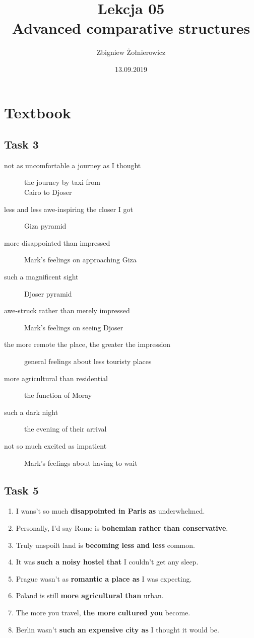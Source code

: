 \documentclass[a4paper]{article}
\begin{document}
\title{{\huge Lekcja 05} \\
{\large Advanced comparative structures}}
\author{Zbigniew Żołnierowicz}
\date{13.09.2019}
\maketitle
\section*{Textbook}
\subsection{Task 3}
\begin{description}
    \item[not as uncomfortable a journey as I thought] the journey by taxi from \\
    Cairo to Djoser
    \item[less and less awe-inspiring the closer I got] Giza pyramid
    \item[more disappointed than impressed] Mark's feelings on approaching Giza
    \item[such a magnificent sight] Djoser pyramid
    \item[awe-struck rather than merely impressed] Mark's feelings on seeing Djoser 
    \item[the more remote the place, the greater the impression] general feelings about less touristy places
    \item[more agricultural than residential] the function of Moray
    \item[such a dark night] the evening of their arrival
    \item[not so much excited as impatient] Mark's feelings about having to wait
\end{description}
\subsection{Task 5}
\begin{enumerate}
    \item I wans't so much \textbf{disappointed in Paris as} underwhelmed.
    \item Personally, I'd say Rome is \textbf{bohemian rather than conservative}.
    \item Truly unspoilt land is \textbf{becoming less and less} common.
    \item It was \textbf{such a noisy hostel that} I couldn't get any sleep.
    \item Prague wasn't as \textbf{romantic a place as} I was expecting.
    \item Poland is still \textbf{more agricultural than} urban.
    \item The more you travel, \textbf{the more cultured you} become.
    \item Berlin wasn't \textbf{such an expensive city as} I thought it would be.
\end{enumerate}
\end{document}
